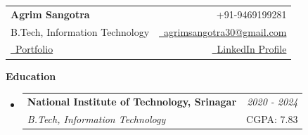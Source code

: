 \documentclass[a4paper,10pt]{article}
\makeatletter
\newcommand{\resumeSubheading}[4]{
  \vspace{0.5mm}\item
  \begin{tabular*}{0.98\textwidth}[t]{l@{\extracolsep{\fill}}r}
    \textbf{#1} & \textit{\footnotesize{#4}} \\
    \textit{\footnotesize{#3}} & \footnotesize{#2}\\
  \end{tabular*}
  \vspace{-1.4mm}
}
\newcommand{\resumeSubHeadingListStart}{\begin{itemize}[leftmargin=*,label={}]}
\newcommand{\resumeSubHeadingListEnd}{\end{itemize}}
\newcommand{\cvsection}[1]{%
  \vspace{4.5mm} %
  \begin{tcolorbox}
    \textbf{\large #1}
  \end{tcolorbox}
  \vspace{-6mm}
}
\newcommand{\name}{Agrim Sangotra} %
\newcommand{\course}{B.Tech} %
\newcommand{\branch}{Information Technology} %
\newcommand{\phone}{9469199281} %
\newcommand{\emaila}{agrimsangotra30@gmail.com} %
\makeatother
\begin{document}
  \selectfont

  \parbox{\dimexpr\linewidth-0.4cm\relax}{
    \begin{tabularx}{\linewidth}{L r}
      \textbf{\Large \name} & {\raisebox{0.0\height}{\footnotesize \faPhone}\ +91-\phone}\\[3pt]
      \course, \branch & \href{mailto:\emaila}{\raisebox{0.0\height}{\footnotesize \faEnvelope}\ {\emaila}} \\[3pt]
      \href{https://portfolio-cd6hwyca7-agrim-anis-projects.vercel.app/}{\raisebox{0.0\height}{\footnotesize \faGlobe}\ {Portfolio}} & \href{https://www.linkedin.com/in/agrim-sangotra-203015210}{\raisebox{0.0\height}{\footnotesize \faLinkedin}\ {LinkedIn Profile}}
    \end{tabularx}
  }


\cvsection{Education}
\vspace{10pt}
\resumeSubHeadingListStart
\resumeSubheading
{National Institute of Technology, Srinagar}{CGPA: 7.83}
{B.Tech, Information Technology}{2020 - 2024}
\resumeSubHeadingListEnd
\end{document}

